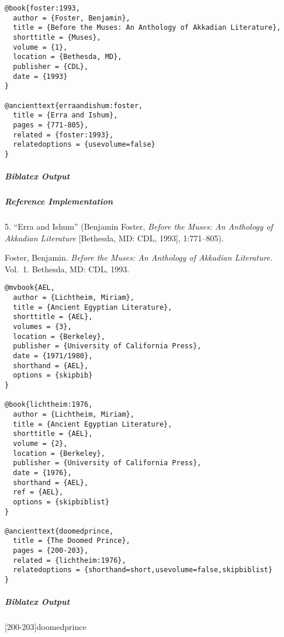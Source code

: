 \documentclass[a4paper]{article}
\newenvironment{biboutput}{%
  \subparagraph{Biblatex Output}
}{\color{black}}
\newenvironment{refimp}{%
  \subparagraph{Reference Implementation}
  \color{reference-colour}
  \rm
}{\par\color{black}}
\begin{document}
\medskip

\begin{lstlisting}
@book{foster:1993,
  author = {Foster, Benjamin},
  title = {Before the Muses: An Anthology of Akkadian Literature},
  shorttitle = {Muses},
  volume = {1},
  location = {Bethesda, MD},
  publisher = {CDL},
  date = {1993}
}

@ancienttext{erraandishum:foster,
  title = {Erra and Ishum},
  pages = {771-805},
  related = {foster:1993},
  relatedoptions = {usevolume=false}
}
\end{lstlisting}

\begin{biboutput}
\end{biboutput}

\begin{refimp}
  \hspace*{\bibindent}5. “Erra and Ishum” (Benjamin Foster, \emph{Before the
  Muses: An Anthology of Akkadian Literature} [Bethesda, MD: CDL, 1993],
  1:771–805).
  
  \hangindent\bibindent Foster, Benjamin. \emph{Before the Muses: An Anthology of
  Akkadian Literature.} Vol.~1. Bethesda, MD: CDL, 1993.
\end{refimp}

\medskip

\begin{lstlisting}
@mvbook{AEL,
  author = {Lichtheim, Miriam},
  title = {Ancient Egyptian Literature},
  shorttitle = {AEL},
  volumes = {3},
  location = {Berkeley},
  publisher = {University of California Press},
  date = {1971/1980},
  shorthand = {AEL},
  options = {skipbib}
}

@book{lichtheim:1976,
  author = {Lichtheim, Miriam},
  title = {Ancient Egyptian Literature},
  shorttitle = {AEL},
  volume = {2},
  location = {Berkeley},
  publisher = {University of California Press},
  date = {1976},
  shorthand = {AEL},
  ref = {AEL},
  options = {skipbiblist}
}

@ancienttext{doomedprince,
  title = {The Doomed Prince},
  pages = {200-203},
  related = {lichtheim:1976},
  relatedoptions = {shorthand=short,usevolume=false,skipbiblist}
}
\end{lstlisting}

\begin{biboutput}
  [200-203]{doomedprince}
\end{biboutput}
\end{document}
